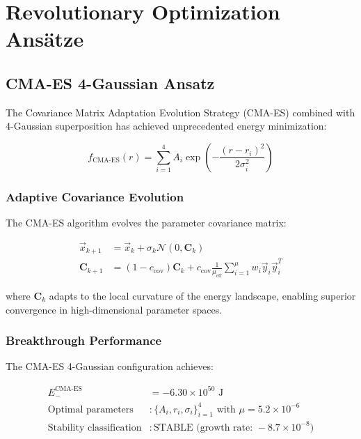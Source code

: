 \documentclass[12pt,a4paper]{article}
\begin{document}
\section{Revolutionary Optimization Ansätze}

\subsection{CMA-ES 4-Gaussian Ansatz}

The Covariance Matrix Adaptation Evolution Strategy (CMA-ES) combined with 4-Gaussian superposition has achieved unprecedented energy minimization:

\begin{equation}
f_{\text{CMA-ES}}(r) = \sum_{i=1}^{4} A_i \exp\left(-\frac{(r - r_i)^2}{2\sigma_i^2}\right)
\end{equation}

\subsubsection{Adaptive Covariance Evolution}

The CMA-ES algorithm evolves the parameter covariance matrix:

\begin{align}
\vec{x}_{k+1} &= \vec{x}_k + \sigma_k \mathcal{N}(0, \mathbf{C}_k) \\
\mathbf{C}_{k+1} &= (1-c_{\text{cov}}) \mathbf{C}_k + c_{\text{cov}} \frac{1}{\mu_{\text{eff}}} \sum_{i=1}^{\mu} w_i \vec{y}_i \vec{y}_i^T
\end{align}

where $\mathbf{C}_k$ adapts to the local curvature of the energy landscape, enabling superior convergence in high-dimensional parameter spaces.

\subsubsection{Breakthrough Performance}

The CMA-ES 4-Gaussian configuration achieves:

\begin{align}
E_{-}^{\text{CMA-ES}} &= -6.30 \times 10^{50} \text{ J} \\
\text{Optimal parameters} &: \{A_i, r_i, \sigma_i\}_{i=1}^4 \text{ with } \mu = 5.2 \times 10^{-6} \\
\text{Stability classification} &: \text{STABLE (growth rate: } -8.7 \times 10^{-8})
\end{align}
\end{document}
